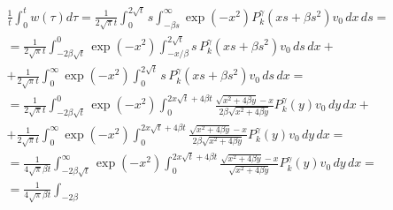 \begin{multline}


\frac{1}{t} \int_0^t w(\tau) d\tau =


\frac{1}{2\sqrt{\pi}t} \int_0^{2\sqrt{t}} s


 \int_{-\beta s}^\infty


\exp (-x^2 )P_k^\gamma (xs+\beta s^2 )v_0\, dx\, ds=\\


%


=\frac{1}{2\sqrt{\pi}t} \int_{-2\beta \sqrt{t}}^0


\exp (-x^2) \int_{-x/\beta}^{2\sqrt{t}}


s\, P_k^\gamma (xs+\beta s^2 ) v_0\, ds\, dx +\\


%


+\frac{1}{2\sqrt{\pi}t} \int_{0}^\infty


\exp(-x^2) \int_{0}^{2\sqrt{t}}


s\, P_k^\gamma(xs+\beta s^2 ) v_0\, ds\, dx=\\


%


=\frac{1}{2\sqrt{\pi}t} \int_{-2\beta \sqrt{t}}^0


\exp (-x^2) \int_{0}^{2x\sqrt{t}+4\beta t}


\frac{\sqrt{x^2+4\beta y}-x}{2\beta\sqrt{x^2+4\beta y}}


P_k^\gamma(y) v_0\, dy\, dx +\\


%


+\frac{1}{2\sqrt{\pi}t} \int_{0}^\infty


\exp (-x^2 ) \int_{0}^{2x\sqrt{t}+4\beta t}


\frac{\sqrt{x^2+4\beta y}-x}{2\beta\sqrt{x^2+4\beta y}}


P_k^\gamma(y) v_0\, dy\, dx= \\


%


=\frac{1}{4\sqrt{\pi}\beta t} \int_{-2\beta


\sqrt{t}}^\infty \exp (-x^2 )


\int_{0}^{2x\sqrt{t}+4\beta t}


\frac{\sqrt{x^2+4\beta y}-x}{\sqrt{x^2+4\beta y}}


P_k^\gamma(y) v_0\, dy\, dx=\\


%


=\frac{1}{4\sqrt{\pi}\beta t} \int_{-2\beta


}
\end{multline}
